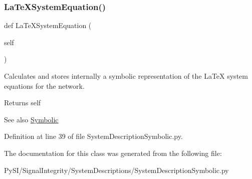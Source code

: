 \subsubsection{\texorpdfstring{La\+Te\+X\+System\+Equation()}{LaTeXSystemEquation()}}
{\footnotesize\ttfamily def La\+Te\+X\+System\+Equation (\begin{DoxyParamCaption}\item[{}]{self }\end{DoxyParamCaption})}



Calculates and stores internally a symbolic representation of the La\+TeX system equations for the network. 

\begin{DoxyReturn}{Returns}
self 
\end{DoxyReturn}
\begin{DoxySeeAlso}{See also}
\hyperlink{namespaceSignalIntegrity_1_1SystemDescriptions_1_1Symbolic}{Symbolic} 
\end{DoxySeeAlso}


Definition at line 39 of file System\+Description\+Symbolic.\+py.



The documentation for this class was generated from the following file\+:\begin{DoxyCompactItemize}
\item 
Py\+S\+I/\+Signal\+Integrity/\+System\+Descriptions/System\+Description\+Symbolic.\+py\end{DoxyCompactItemize}
